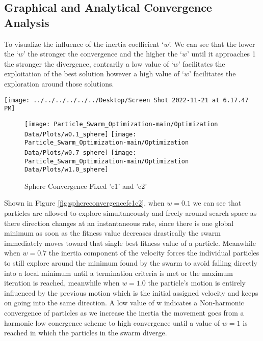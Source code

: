 \documentclass[
]{article}
\begin{document}
\hypertarget{graphical-and-analytical-convergence-analysis}{%
\subsection{Graphical and Analytical Convergence
Analysis}\label{graphical-and-analytical-convergence-analysis}}

To visualize the influence of the inertia coefficient `\(w\)'. We can
see that the lower the `\(w\)' the stronger the convergence and the
higher the `\(w\)' until it approaches 1 the stronger the divergence,
contrarily a low value of `\(w\)' facilitates the exploitation of the
best solution however a high value of `\(w\)' facilitates the
exploration around those solutions.

\begin{center}\texttt{[image: ../../../../../../Desktop/Screen Shot 2022-11-21 at 6.17.47 PM]} \end{center}

\begin{figure}[H]

{\centering \texttt{[image: Particle\_Swarm\_Optimization-main/Optimization Data/Plots/w0.1\_sphere]} \texttt{[image: Particle\_Swarm\_Optimization-main/Optimization Data/Plots/w0.7\_sphere]} \texttt{[image: Particle\_Swarm\_Optimization-main/Optimization Data/Plots/w1.0\_sphere]} 

}

\caption{Sphere Convergence Fixed 'c1' and 'c2' \label{fig:sphereconvergencefc1c2}}\label{fig:sphereconvergencefc1c2 }
\end{figure}

Shown in Figure \ref{fig:sphereconvergencefc1c2}, when \(w=0.1\) we can
see that particles are allowed to explore simultaneously and freely
around search space as there direction changes at an instantaneous rate,
since there is one global minimum as soon as the fitness value decreases
drastically the swarm immediately moves toward that single best fitness
value of a particle. Meanwhile when \(w=0.7\) the inertia component of
the velocity forces the individual particles to still explore around the
minimum found by the swarm to avoid falling directly into a local
minimum until a termination criteria is met or the maximum iteration is
reached, meanwhile when \(w=1.0\) the particle's motion is entirely
influenced by the previous motion which is the initial assigned velocity
and keeps on going into the same direction. A low value of w indicates a
Non-harmonic convergence of particles as we increase the inertia the
movement goes from a harmonic low conergence scheme to high convergence
until a value of \(w=1\) is reached in which the particles in the swarm
diverge.
\end{document}
